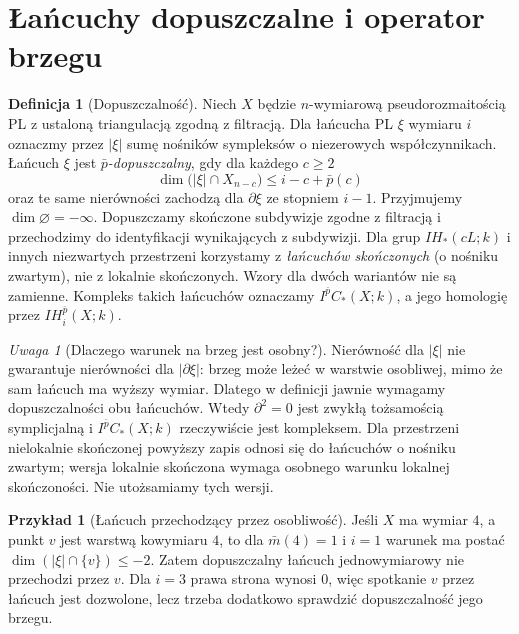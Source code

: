 \documentclass[11pt,a4paper,oneside]{report}
\theoremstyle{plain}
\theoremstyle{definition}
\newtheorem{definicja}[twierdzenie]{Definicja}
\newtheorem{przyklad}[twierdzenie]{Przykład}
\theoremstyle{remark}
\newtheorem{uwaga}[twierdzenie]{Uwaga}
\begin{document}
\section{Łańcuchy dopuszczalne i operator brzegu}
\begin{definicja}[Dopuszczalność]
\label{def:allowability-xiii}
Niech $X$ będzie $n$-wymiarową pseudorozmaitością PL
z ustaloną triangulacją zgodną z filtracją.
Dla łańcucha PL $\xi$ wymiaru $i$ oznaczmy przez
$|\xi|$ sumę nośników sympleksów o niezerowych
współczynnikach. Łańcuch $\xi$ jest
\emph{$\bar p$-dopuszczalny}, gdy dla każdego $c\ge2$
\[
\dim\bigl(|\xi|\cap X_{n-c}\bigr)
\le i-c+\bar p(c)
\]
oraz te same nierówności zachodzą dla $\partial\xi$
ze stopniem $i-1$. Przyjmujemy
$\dim\varnothing=-\infty$. Dopuszczamy skończone
subdywizje zgodne z filtracją i przechodzimy do
identyfikacji wynikających z subdywizji.
Dla grup $IH_*(cL;k)$ i innych niezwartych przestrzeni
korzystamy z \emph{łańcuchów skończonych}
(o nośniku zwartym), nie z lokalnie skończonych.
Wzory dla dwóch wariantów nie są zamienne.
Kompleks takich łańcuchów oznaczamy
$I^{\bar p}C_*(X;k)$, a jego homologię przez
$IH_i^{\bar p}(X;k)$.
\end{definicja}
\begin{uwaga}[Dlaczego warunek na brzeg jest osobny?]
Nierówność dla $|\xi|$ nie gwarantuje nierówności
dla $|\partial\xi|$: brzeg może leżeć w warstwie
osobliwej, mimo że sam łańcuch ma wyższy wymiar.
Dlatego w definicji jawnie wymagamy dopuszczalności
obu łańcuchów. Wtedy $\partial^2=0$ jest zwykłą
tożsamością symplicjalną i
$I^{\bar p}C_*(X;k)$ rzeczywiście jest kompleksem.
Dla przestrzeni nielokalnie skończonej powyższy zapis
odnosi się do łańcuchów o nośniku zwartym;
wersja lokalnie skończona wymaga osobnego warunku
lokalnej skończoności. Nie utożsamiamy tych wersji.
\end{uwaga}
\begin{przyklad}[Łańcuch przechodzący przez osobliwość]
Jeśli $X$ ma wymiar $4$, a punkt $v$ jest warstwą
kowymiaru $4$, to dla $\bar m(4)=1$ i $i=1$
warunek ma postać $\dim(|\xi|\cap\{v\})\le-2$.
Zatem dopuszczalny łańcuch jednowymiarowy nie
przechodzi przez $v$. Dla $i=3$ prawa strona wynosi
$0$, więc spotkanie $v$ przez łańcuch jest dozwolone,
lecz trzeba dodatkowo sprawdzić dopuszczalność jego brzegu.
\end{przyklad}
\end{document}
